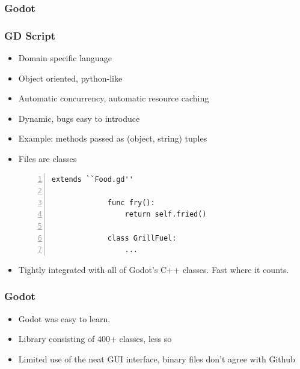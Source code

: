 \documentclass{beamer}
\begin{document}
\begin{frame}
    \frametitle{Godot} %
\end{frame}

\begin{frame}[fragile]
    \frametitle{GD Script} %
    \begin{itemize}
        \pause \item Domain specific language
        \pause \item Object oriented, python-like
        \pause \item Automatic concurrency, automatic resource caching
        \pause \item Dynamic, bugs easy to introduce
        \pause \item Example: methods passed as (object, string) tuples

        \pause \item Files are classes

        \begin{Verbatim}[numbers=left]
             extends ``Food.gd''

             func fry():
                 return self.fried()

             class GrillFuel:
                 ...
        \end{Verbatim}

        \pause \item Tightly integrated with all of Godot's C++ classes. Fast
            where it counts.
    \end{itemize}
\end{frame}

\begin{frame}
    \frametitle{Godot} %
    \begin{itemize}
    \item Godot was easy to learn.
    \pause \item Library consisting of 400+ classes, less so
    \pause \item Limited use of the neat GUI interface, binary files don't
        agree with Github
    \end{itemize}

\end{frame}
\end{document}
